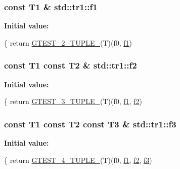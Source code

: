 \subsubsection[{f1}]{\setlength{\rightskip}{0pt plus 5cm}const T1 \& std\+::tr1\+::f1}\label{namespacestd_1_1tr1_a9c0fa65b105f8e2f58ba59ecf75fd000}
{\bfseries Initial value\+:}
\begin{DoxyCode}
\{
  \textcolor{keywordflow}{return} \hyperlink{gtest-tuple_8h_a93229c3f009273c73eca237b4d19f326}{GTEST\_2\_TUPLE\_}(T)(f0, \hyperlink{namespacestd_1_1tr1_a9c0fa65b105f8e2f58ba59ecf75fd000}{f1})
\end{DoxyCode}
\hypertarget{namespacestd_1_1tr1_a87dd9e009868361317f587126dba63d4}{}
\subsubsection[{f2}]{\setlength{\rightskip}{0pt plus 5cm}const T1 const T2 \& std\+::tr1\+::f2}\label{namespacestd_1_1tr1_a87dd9e009868361317f587126dba63d4}
{\bfseries Initial value\+:}
\begin{DoxyCode}
\{
  \textcolor{keywordflow}{return} \hyperlink{gtest-tuple_8h_af2c3eab3f1a5197b408fce44eb3ed9da}{GTEST\_3\_TUPLE\_}(T)(f0, \hyperlink{namespacestd_1_1tr1_a9c0fa65b105f8e2f58ba59ecf75fd000}{f1}, \hyperlink{namespacestd_1_1tr1_a87dd9e009868361317f587126dba63d4}{f2})
\end{DoxyCode}
\hypertarget{namespacestd_1_1tr1_a0f7c3b47d27d42d82d1a333ea420ce4e}{}
\subsubsection[{f3}]{\setlength{\rightskip}{0pt plus 5cm}const T1 const T2 const T3 \& std\+::tr1\+::f3}\label{namespacestd_1_1tr1_a0f7c3b47d27d42d82d1a333ea420ce4e}
{\bfseries Initial value\+:}
\begin{DoxyCode}
\{
  \textcolor{keywordflow}{return} \hyperlink{gtest-tuple_8h_a3625feb24d5e6eb9926fd558e4a2e3ff}{GTEST\_4\_TUPLE\_}(T)(f0, \hyperlink{namespacestd_1_1tr1_a9c0fa65b105f8e2f58ba59ecf75fd000}{f1}, \hyperlink{namespacestd_1_1tr1_a87dd9e009868361317f587126dba63d4}{f2}, \hyperlink{namespacestd_1_1tr1_a0f7c3b47d27d42d82d1a333ea420ce4e}{f3})
\end{DoxyCode}
\hypertarget{namespacestd_1_1tr1_adc796e02b7385d526aff708189564f67}{}
